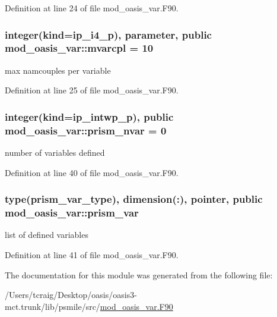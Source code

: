 Definition at line 24 of file mod\+\_\+oasis\+\_\+var.\+F90.

\hypertarget{classmod__oasis__var_a687d6dce16699f36ae3a67accfdba3a9}{
\subsubsection[{mvarcpl}]{\setlength{\rightskip}{0pt plus 5cm}integer(kind=ip\+\_\+i4\+\_\+p), parameter, public mod\+\_\+oasis\+\_\+var\+::mvarcpl = 10}}\label{classmod__oasis__var_a687d6dce16699f36ae3a67accfdba3a9}


max namcouples per variable 



Definition at line 25 of file mod\+\_\+oasis\+\_\+var.\+F90.

\hypertarget{classmod__oasis__var_a095f8ad84e6afbcbe1744d4a9f924e08}{
\subsubsection[{prism\+\_\+nvar}]{\setlength{\rightskip}{0pt plus 5cm}integer(kind=ip\+\_\+intwp\+\_\+p), public mod\+\_\+oasis\+\_\+var\+::prism\+\_\+nvar = 0}}\label{classmod__oasis__var_a095f8ad84e6afbcbe1744d4a9f924e08}


number of variables defined 



Definition at line 40 of file mod\+\_\+oasis\+\_\+var.\+F90.

\hypertarget{classmod__oasis__var_ae66c490437c2960d795fbd3d2c773a0a}{
\subsubsection[{prism\+\_\+var}]{\setlength{\rightskip}{0pt plus 5cm}type({\bf prism\+\_\+var\+\_\+type}), dimension(\+:), pointer, public mod\+\_\+oasis\+\_\+var\+::prism\+\_\+var}}\label{classmod__oasis__var_ae66c490437c2960d795fbd3d2c773a0a}


list of defined variables 



Definition at line 41 of file mod\+\_\+oasis\+\_\+var.\+F90.



The documentation for this module was generated from the following file\+:\begin{DoxyCompactItemize}
\item 
/\+Users/tcraig/\+Desktop/oasis/oasis3-\/mct.\+trunk/lib/psmile/src/\hyperlink{mod__oasis__var_8_f90}{mod\+\_\+oasis\+\_\+var.\+F90}\end{DoxyCompactItemize}
